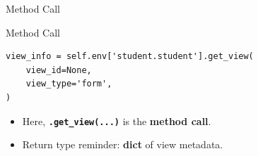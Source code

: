 \begin{frame}[fragile]{Method Call}
\begin{block}{Method Call}
\begin{lstlisting}
view_info = self.env['student.student'].get_view(
	view_id=None,
	view_type='form',
)
\end{lstlisting}
	\begin{itemize}
		\item Here, \textbf{\texttt{.get\_view(...)}} is the \textbf{method call}.
		\item Return type reminder: \textbf{dict} of view metadata.
	\end{itemize}
\end{block}
\end{frame}
